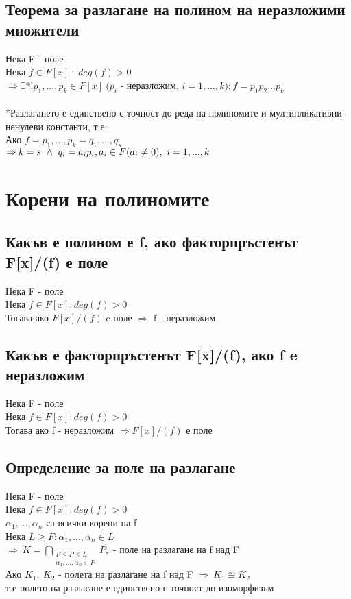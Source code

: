 \documentclass[12pt]{article}
\begin{document}
\subsection{Теорема за разлагане на полином на неразложими множители}
Нека F - поле \\
Нека $f \in F[x]\ :\ deg(f) > 0$ \\
$\Rightarrow \exists $*$! p_1,...,p_k \in F[x] \ (p_i$ - неразложим, $i = 1,...,k) : f = p_1p_2...p_k$ \\ \\
*Разлагането е единствено с точност до реда на полиномите и мултипликативни ненулеви константи, т.е: \\
Ако $f = p_1,...,p_k = q_1,...,q_s$ \\
$\Rightarrow k = s \ \land \ q_i=a_ip_i,\\
 a_i \in F (a_i \neq 0),\ i=1,...,k$ \\

\section{Корени на полиномите}

\subsection{Какъв е полином е f, ако факторпръстенът F[x]/(f) е поле}
Нека F - поле \\
Нека $f \in F[x] : deg(f) > 0$ \\
Тогава ако $F[x]/(f)$ e поле $ \Rightarrow$ f - неразложим

\subsection{Какъв е факторпръстенът F[x]/(f), ако f e неразложим}
Нека F - поле \\
Нека $f \in F[x] : deg(f) > 0$ \\
Тогава ако f - неразложим $\Rightarrow F[x]/(f)$ е поле 

\subsection{Определение за поле на разлагане}
Нека F - поле\\
Нека $f \in F[x] : deg(f) > 0$\\
$\alpha_1,...,\alpha_n$ са всички корени на f\\
Нека $L \geq F : \alpha_1,...,\alpha_n \in L$ \\
$\Rightarrow\ K = \bigcap\limits_{\substack{F \leq P \leq L \\ \alpha_1,...,\alpha_n \in P}} P,  $ - поле на разлагане на f над F\\
Ако $K_1,\ K_2$ - полета на разлагане на f над F $\Rightarrow\ K_1 \cong K_2$\\
т.е полето на разлагане е единствено с точност до изоморфизъм
\end{document}
